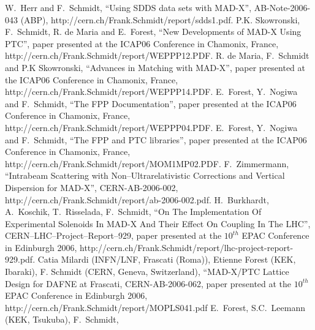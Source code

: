 \documentclass[12pt]{article} \textwidth 17cm \hoffset -2cm
\begin{document}
 

\begin{thebibliography}{99}
% 
 W.~Herr and F.~Schmidt, ``Using SDDS data sets with
  MAD-X'', AB-Note-2006-043 (ABP),
  {http://cern.ch/Frank.Schmidt/report/sdds1.pdf}.
% 
 P.K. Skowronski, F.~Schmidt, R. de Maria and
  E.~Forest, ``New Developments of MAD-X Using PTC'', paper presented
  at the ICAP06 Conference in Chamonix, France,
  {http://cern.ch/Frank.Schmidt/report/WEPPP12.PDF}.
% 
 R. de Maria, F.~Schmidt and P.K Skowronski, ``Advances
  in Matching with MAD-X'', paper presented at the ICAP06 Conference
  in Chamonix, France,
  {http://cern.ch/Frank.Schmidt/report/WEPPP14.PDF}.
% 
 E.~Forest, Y.~Nogiwa and F.~Schmidt, ``The FPP
  Documentation'', paper presented at the ICAP06 Conference in
  Chamonix, France,
  {http://cern.ch/Frank.Schmidt/report/WEPPP04.PDF}.
% 
 E.~Forest, Y.~Nogiwa and F.~Schmidt, ``The FPP and PTC
  libraries'', paper presented at the ICAP06 Conference in Chamonix,
  France,
  {http://cern.ch/Frank.Schmidt/report/MOM1MP02.PDF}.
% 
 F.~Zimmermann, ``Intrabeam Scattering with
  Non--Ultrarelativistic Corrections and Vertical Dispersion for
  MAD-X'', CERN-AB-2006-002,
  {http://cern.ch/Frank.Schmidt/report/ab-2006-002.pdf}.
% 
 H.~Burkhardt, A.~Koschik, T.~Risselada, F.~Schmidt, ``On
  The Implementation Of Experimental Solenoids In MAD-X And Their
  Effect On Coupling In The LHC'',  CERN--LHC--Project--Report--929,
  paper presented at the $10^{th}$ EPAC Conference in Edinburgh 2006,
  {http://cern.ch/Frank.Schmidt/report/lhc-project-report-929.pdf}.
%
 Catia Milardi (INFN/LNF, Frascati (Roma)), Etienne Forest
  (KEK, Ibaraki), F. Schmidt (CERN, Geneva, Switzerland), ``MAD-X/PTC
  Lattice Design for DAFNE at Frascati, CERN-AB-2006-062, paper
  presented   at the $10^{th}$ EPAC Conference in Edinburgh 2006,
  {http://cern.ch/Frank.Schmidt/report/MOPLS041.pdf}
%
 E.~Forest, S.C.~Leemann (KEK, Tsukuba), F.~Schmidt,

\end{thebibliography}
\end{document}
